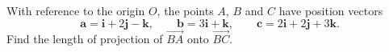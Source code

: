 \begin{example}[label=ex:2.6]
With reference to the origin $O$, the points $A$, $B$ and $C$ have position vectors
\[
\mathbf{a} = \mathbf{i} + 2\mathbf{j} - \mathbf{k}, \qquad \mathbf{b} = 3\mathbf{i} + \mathbf{k}, \qquad \mathbf{c} = 2\mathbf{i} + 2\mathbf{j} + 3\mathbf{k}.
\]
Find the length of projection of $\overrightarrow{BA}$ onto $\overrightarrow{BC}$.
\end{example}
